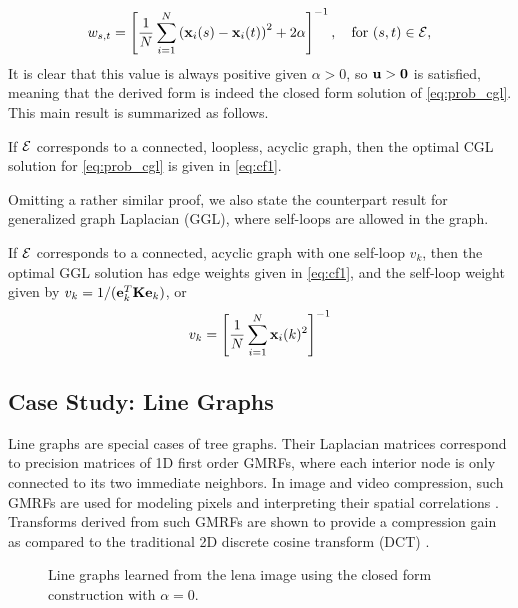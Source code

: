 \documentclass{article}
\begin{document}
\begin{equation}
\label{eq:cf1}
  w_{s,t} = \left[\frac{1}{N}\sum_{i=1}^N\left({\bf x}_i(s)-{\bf x}_i(t)\right)^2+2\alpha\right]^{-1},\quad \text{for }(s,t)\in{\cal E},
\end{equation}
It is clear that this value is always positive given $\alpha>0$, so ${\bf u}>{\bf 0}$ is satisfied, meaning that the derived form is indeed the closed form solution of \eqref{eq:prob_cgl}. This main result is summarized as follows.
\begin{theorem}
\label{thm:main}
If ${\cal E}$ corresponds to a connected, loopless, acyclic graph, then the optimal CGL solution for \eqref{eq:prob_cgl} is given in \eqref{eq:cf1}.
\end{theorem}
Omitting a rather similar proof, we also state the counterpart result for generalized graph Laplacian (GGL), where self-loops are allowed in the graph. 
\begin{theorem}
\label{thm:main_ggl}
If ${\cal E}$ corresponds to a connected, acyclic graph with one self-loop $v_k$, then the optimal GGL solution has edge weights given in \eqref{eq:cf1}, and the self-loop weight given by $v_k=1/({\bf e}_k^T{\bf K}{\bf e}_k)$, or
\begin{equation}
\label{eq:cf2}
  v_k = \left[\frac{1}{N}\sum_{i=1}^N{\bf x}_i(k)^2\right]^{-1}
\end{equation}
\end{theorem}

\subsection{Case Study: Line Graphs}
\label{sec:line}
Line graphs are special cases of tree graphs. Their Laplacian matrices correspond to precision matrices of 1D first order GMRFs, where each interior node is only connected to its two immediate neighbors. In image and video compression, such GMRFs are used for modeling pixels and interpreting their spatial correlations \cite{Zhang2013}. Transforms derived from such GMRFs are shown to provide a compression gain as compared to the traditional 2D discrete cosine transform (DCT) \cite{Egilmez2015,Pavez2017icip}. 

\begin{figure}
\centering
{}
\caption{Line graphs learned from the lena image using the closed form construction with $\alpha=0$.}
\label{fig:lgs_lena}
\vspace{-.3cm}
\end{figure}
\end{document}
